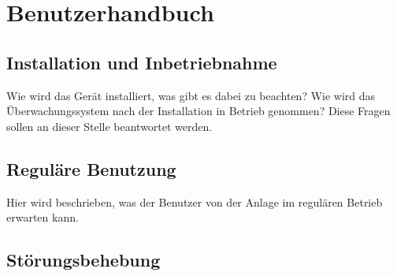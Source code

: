\chapter{Benutzerhandbuch}
\label{chap:userguide}

\section{Installation und Inbetriebnahme}
\label{sec:userguide:installation}

Wie wird das Ger\"at installiert, was  gibt es dabei zu beachten? Wie wird das
\"Uberwachungssystem nach  der Installation in Betrieb  genommen? Diese Fragen
sollen an dieser Stelle beantwortet werden.


\section{Regul\"are Benutzung}
\label{sec:userguide:regular}

Hier wird beschrieben, was der Benutzer  von der Anlage im regul\"aren Betrieb
erwarten kann.

\section{St\"orungsbehebung}
\label{sec:userguide:errors}

